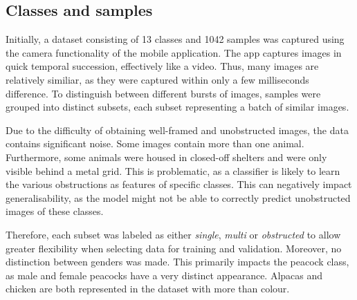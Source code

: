 \documentclass{l4proj}
\begin{document}
\subsection{Classes and samples}
\label{classes_samples}

Initially, a dataset consisting of 13 classes and 1042 samples was captured using the camera functionality of the mobile application. The app captures images in quick temporal succession, effectively like a video. Thus, many images are relatively similiar, as they were captured within only a few milliseconds difference. To distinguish between different bursts of images, samples were grouped into distinct subsets, each subset representing a batch of similar images.

Due to the difficulty of obtaining well-framed and unobstructed images, the data contains significant noise. Some images contain more than one animal. Furthermore, some animals were housed in closed-off shelters and were only visible behind a metal grid. This is problematic, as a classifier is likely to learn the various obstructions as features of specific classes. This can negatively impact generalisability, as the model might not be able to correctly predict unobstructed images of these classes.

Therefore, each subset was labeled as either \textit{single}, \textit{multi} or \textit{obstructed} to allow greater flexibility when selecting data for training and validation. Moreover, no distinction between genders was made. This primarily impacts the peacock class, as male and female peacocks have a very distinct appearance. Alpacas and chicken are both represented in the dataset with more than colour.
\end{document}
